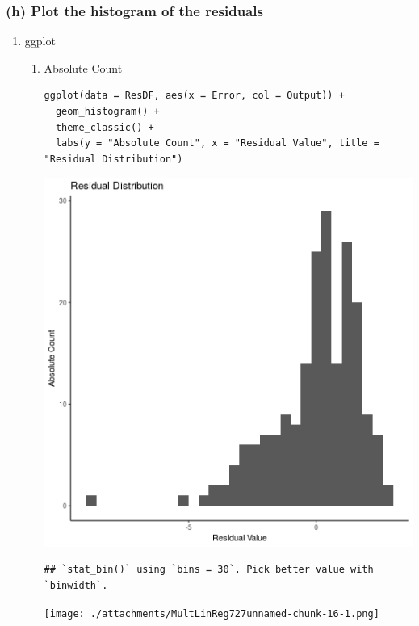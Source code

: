 \documentclass[11pt]{article}
\begin{document}
\subsubsection{(h) Plot the histogram of the residuals}
\label{sec:org196f8f2}
\begin{enumerate}
\item ggplot
\label{sec:orgcaf68ea}
\begin{enumerate}
\item Absolute Count
\label{sec:orgce7475e}
\begin{verbatim}
ggplot(data = ResDF, aes(x = Error, col = Output)) +
  geom_histogram() +
  theme_classic() +
  labs(y = "Absolute Count", x = "Residual Value", title = "Residual Distribution") 
\end{verbatim}

\begin{center}
\includegraphics[width=.9\linewidth]{HistResGGMultLinReg.png}
\end{center}

\begin{verbatim}
## `stat_bin()` using `bins = 30`. Pick better value with `binwidth`.
\end{verbatim}

\begin{center}
\texttt{[image: ./attachments/MultLinReg727unnamed-chunk-16-1.png]}
\end{center}


\end{enumerate}
\end{enumerate}
\end{document}
